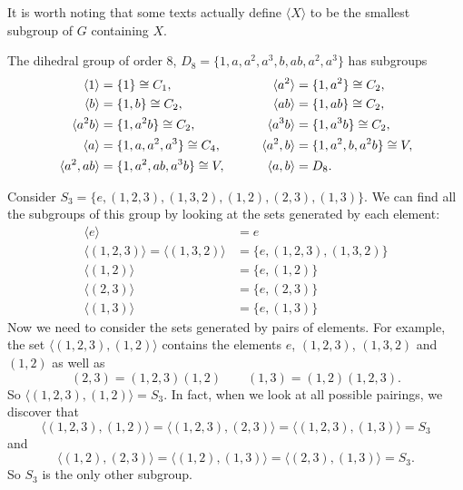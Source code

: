 It is worth noting that some texts actually define $\langle X \rangle$
to be the smallest subgroup of $G$ containing $X$.

\begin{example}\label{eg:D8subgroups}
  The dihedral group of order $8$, $D_{8} = \{1,
  a, a^{2}, a^{3}, b, ab, a^{2}, a^{3}\}$ has subgroups
  \begin{alignat*}{2}
    \langle 1 \rangle &= \{1\} \cong C_{1},
    &\langle a^{2} \rangle &= \{1, a^{2}\} \cong C_{2},\\
    \langle b \rangle &= \{1, b\} \cong C_{2},
    &\langle ab \rangle &= \{1, ab\} \cong C_{2},\\
    \langle a^{2}b \rangle &= \{1, a^{2}b\} \cong C_{2},
    &\langle a^{3}b \rangle &= \{1, a^{3}b\} \cong C_{2},\\
    \langle a \rangle &= \{1, a, a^{2}, a^{3}\} \cong C_{4},
    &\langle a^{2}, b \rangle &= \{1, a^{2}, b, a^{2}b\} \cong V,\\
    \langle a^{2}, ab \rangle &= \{1, a^{2}, ab, a^{3}b\} \cong V,
    \qquad &\langle a, b \rangle &= D_{8}.
  \end{alignat*}
\end{example}

\begin{example}
  Consider $S_{3} = \{e, (1,2,3), (1,3,2), (1,2), (2,3), (1,3)\}$.  We can
  find all the subgroups of this group by looking at the sets generated by
  each element:
  \begin{align*}
    \langle e \rangle &= e\\
    \langle (1,2,3) \rangle = \langle (1,3,2) \rangle &= \{e, (1,2,3), (1,3,2)\}\\
    \langle (1,2) \rangle &= \{e, (1,2)\}\\
    \langle (2,3) \rangle &= \{e, (2,3)\}\\
    \langle (1,3) \rangle &= \{e, (1,3)\}
  \end{align*}
  Now we need to consider the sets generated by pairs of elements.  For example,
  the set $\langle (1,2,3), (1,2) \rangle$ contains the elements $e$, $(1,2,3)$,
  $(1,3,2)$ and $(1,2)$ as well as
  \[
    (2,3) = (1,2,3)(1,2) \qquad (1,3) = (1,2)(1,2,3).
  \]
  So $\langle (1,2,3), (1,2) \rangle = S_{3}$. In fact, when we look at all
  possible pairings, we discover that
  \[
    \langle (1,2,3), (1,2) \rangle = \langle (1,2,3), (2,3) \rangle = \langle (1,2,3), (1,3) \rangle = S_{3}
  \]
  and
  \[
    \langle (1,2), (2,3) \rangle = \langle (1,2), (1,3) \rangle = \langle (2,3), (1,3) \rangle = S_{3}.
  \]
  So $S_{3}$ is the only other subgroup.
\end{example}

